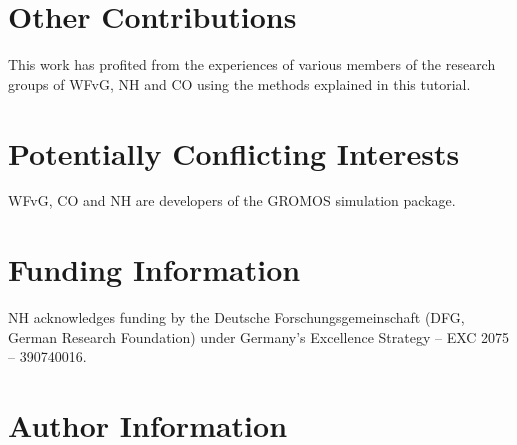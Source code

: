 \documentclass[9pt,tutorial,pubversion]{../includes/livecoms}
\newcommand{\githubrepository}{\url{https://github.com/hansenniels/gromos_tutorial_livecoms}}  %
\begin{document}

\section{Other Contributions}

%
This work has profited from the experiences of various members of the research groups of  WFvG, NH and CO using the methods explained in this tutorial.


\section{Potentially Conflicting Interests}
WFvG, CO and NH are developers of the GROMOS simulation package.

\section{Funding Information}
NH acknowledges funding by the Deutsche Forschungsgemeinschaft (DFG, German Research Foundation) under Germany’s Excellence Strategy – EXC 2075 – 390740016.

\section*{Author Information}
\makeorcid




\end{document}
